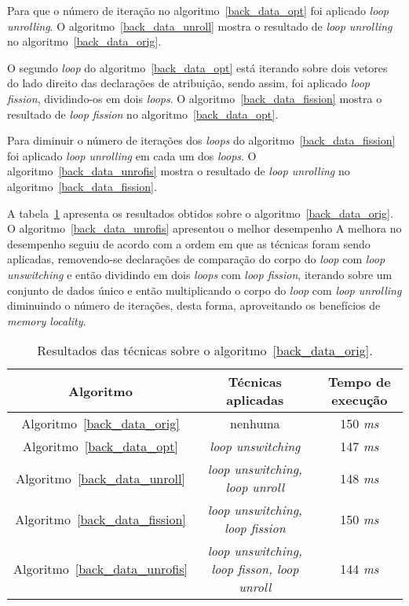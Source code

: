 Para que o número de iteração no algoritmo~\ref{back_data_opt} foi
aplicado \textit{loop unrolling}. O algoritmo~\ref{back_data_unroll} mostra o
resultado de \textit{loop unrolling} no algoritmo~\ref{back_data_orig}.

O segundo \textit{loop} do algoritmo~\ref{back_data_opt} está iterando sobre dois
vetores do lado direito das declarações de atribuição, sendo assim, foi
aplicado \textit{loop fission}, dividindo-os em dois \textit{loops}.
O algoritmo~\ref{back_data_fission} mostra o resultado de \textit{loop fission}
no algoritmo~\ref{back_data_opt}.

Para diminuir o número de iterações dos \textit{loops} do
algoritmo~\ref{back_data_fission} foi aplicado \textit{loop unrolling} em cada um
dos \textit{loops}. O algoritmo~\ref{back_data_unrofis} mostra o resultado de
\textit{loop unrolling} no algoritmo~\ref{back_data_fission}.


A tabela~\ref{tabela_back_data} apresenta os resultados obtidos sobre o
algoritmo~\ref{back_data_orig}.
O algoritmo~\ref{back_data_unrofis} apresentou o melhor desempenho 
A melhora no
desempenho seguiu de acordo com a ordem em que as técnicas foram sendo aplicadas, 
removendo-se
declarações de comparação do corpo do \textit{loop} com \textit{loop
unswitching} e então dividindo em dois
\textit{loops} com \textit{loop fission}, iterando sobre um conjunto de dados único 
e então multiplicando o
corpo do \textit{loop} com \textit{loop unrolling} diminuindo o número de iterações, 
desta forma, aproveitando os benefícios de \textit{memory locality}.

\begin{table}[H]
  \caption{Resultados das técnicas sobre o algoritmo~\ref{back_data_orig}.}
  \label{tabela_back_data}
\begin{center}
  \begin{tabular}{c|c|c}
    Algoritmo & Técnicas aplicadas & Tempo de execução\\
    \hline
    Algoritmo~\ref{back_data_orig} & nenhuma & 150 \textit{ms} \\
    \hline
    Algoritmo~\ref{back_data_opt} & \textit{loop unswitching} & 147 \textit{ms} \\
    \hline
    Algoritmo~\ref{back_data_unroll} & \textit{loop unswitching, loop unroll} & 148 \textit{ms} \\
    \hline
    Algoritmo~\ref{back_data_fission} & \textit{loop unswitching, loop fission} & 150 \textit{ms} \\
    \hline
    Algoritmo~\ref{back_data_unrofis} & \textit{loop unswitching, loop fisson, loop unroll} & 144 \textit{ms} \\
    \hline
  \end{tabular}
\end{center}
\end{table}



